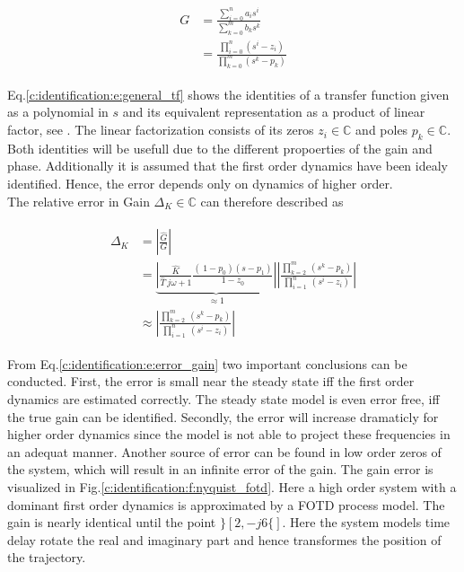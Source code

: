 \begin{align}
\begin{split}
G &=  \frac{\sum_{i=0}^n a_i s^i}{\sum_{k=0}^m b_k s^k} \\
&= \frac{\prod_{i=0}^n \left( s^i - z_i \right)}{\prod_{k=0}^m \left( s^k-p_k\right)} 
\end{split}
\label{c:identification:e:general_tf}
\end{align}

Eq.\ref{c:identification:e:general_tf} shows the identities of a transfer function given as a polynomial in $s$ and its equivalent representation as a product of linear factor, see \cite[p.269 ff.]{Lunze2016}. The linear factorization consists of its zeros $z_i \in \mathbb{C}$ and poles $p_k \in \mathbb{C}$. Both identities will be usefull due to the different propoerties of the gain and phase. Additionally it is assumed that the first order dynamics have been idealy identified. Hence, the error depends only on dynamics of higher order.\\

The relative error in Gain $\Delta_K \in \mathbb{C}$ can therefore described as

\begin{align}
\begin{split}
\Delta_K &= \left| \frac{\hat{G}}{G}\right| \\
&= \underbrace{\left|\frac{\hat{K}}{\hat{T}~j\omega+1} \frac{\left(\ 1-p_0 \right)\left( s- p_1 \right)}{1-z_0} \right|}_{\approx 1} \left| \frac{\prod_{k=2}^m~(s^k-p_k)}{\prod_{i=1}^n~(s^i-z_i)} \right| \\
&\approx \left| \frac{\prod_{k=2}^m~(s^k-p_k)}{\prod_{i=1}^n~(s^i-z_i)} \right|
\end{split}
\label{c:identification:e:error_gain}
\end{align}

From Eq.\ref{c:identification:e:error_gain} two important conclusions can be conducted. First, the error is small near the steady state iff the first order dynamics are estimated correctly. The steady state model is even error free, iff the true gain can be identified. Secondly, the error will increase dramaticly for higher order dynamics since the model is not able to project these frequencies in an adequat manner. Another source of error can be found in low order zeros of the system, which will result in an infinite error of the gain. The gain error is visualized in Fig.\ref{c:identification:f:nyquist_fotd}. Here a high order system with a dominant first order dynamics is approximated by a FOTD process model. The gain is nearly identical until the point $\rbrace[2,-j6\lbrace]$. Here the system models time delay rotate the real and imaginary part and hence transformes the position of the trajectory. \\

